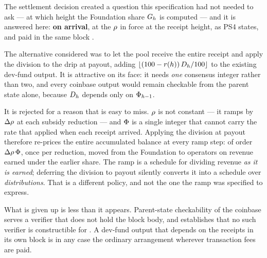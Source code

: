 \begin{remark}
\label{rem:pnr:o21}
The settlement decision created a question this specification had not needed to ask --- at which
height the Foundation share $G_{h}$ is computed --- and it is answered here: \textbf{on arrival},
at the $\rho$ in force at the receipt height, as PS4 states, and paid in the same block
.

The alternative considered was to let the pool receive the entire receipt and apply the division to
the drip at payout, adding $\lfloor (100 - r(h))\,D_{h}/100 \rfloor$ to the existing dev-fund
output. It is attractive on its face: it needs \emph{one} consensus integer rather than two, and
every coinbase output would remain checkable from the parent state alone, because $D_{h}$ depends
only on $\Phi_{h-1}$.

It is rejected for a reason that is easy to miss. $\rho$ is not constant --- it ramps by
$\Delta\rho$ at each subsidy reduction --- and $\Phi$ is a single integer that cannot carry the rate
that applied when each receipt arrived. Applying the division at payout therefore re-prices the
entire accumulated balance at every ramp step: of order $\Delta\rho\,\Phi$, once per reduction,
moved from the Foundation to operators on revenue earned under the earlier share. The ramp is a
schedule for dividing revenue \emph{as it is earned}; deferring the division to payout silently
converts it into a schedule over \emph{distributions}. That is a different policy, and not the one
the ramp was specified to express.

What is given up is less than it appears. Parent-state checkability of the coinbase serves a
verifier that does not hold the block body, and  establishes that no such verifier
is constructible for \Flux. A dev-fund output that depends on the receipts in its own block is in
any case the ordinary arrangement wherever transaction fees are paid.
\end{remark}

